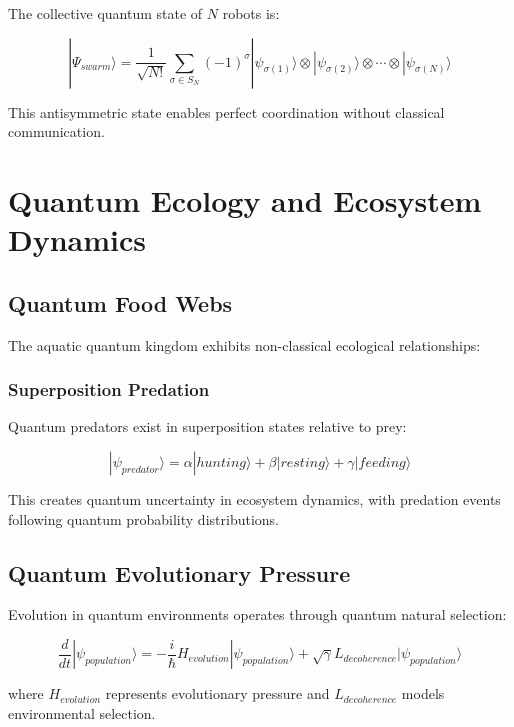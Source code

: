 \documentclass[11pt,a4paper]{article}
\begin{document}
The collective quantum state of $N$ robots is:

\begin{equation}
|\Psi_{swarm}\rangle = \frac{1}{\sqrt{N!}} \sum_{\sigma \in S_N} (-1)^{\sigma} |\psi_{\sigma(1)}\rangle \otimes |\psi_{\sigma(2)}\rangle \otimes \cdots \otimes |\psi_{\sigma(N)}\rangle
\end{equation}

This antisymmetric state enables perfect coordination without classical communication.

\section{Quantum Ecology and Ecosystem Dynamics}

\subsection{Quantum Food Webs}

The aquatic quantum kingdom exhibits non-classical ecological relationships:

\subsubsection{Superposition Predation}

Quantum predators exist in superposition states relative to prey:

\begin{equation}
|\psi_{predator}\rangle = \alpha|hunting\rangle + \beta|resting\rangle + \gamma|feeding\rangle
\end{equation}

This creates quantum uncertainty in ecosystem dynamics, with predation events following quantum probability distributions.

\subsection{Quantum Evolutionary Pressure}

Evolution in quantum environments operates through quantum natural selection:

\begin{equation}
\frac{d}{dt}|\psi_{population}\rangle = -\frac{i}{\hbar}H_{evolution}|\psi_{population}\rangle + \sqrt{\gamma}L_{decoherence}|\psi_{population}\rangle
\end{equation}

where $H_{evolution}$ represents evolutionary pressure and $L_{decoherence}$ models environmental selection.
\end{document}
